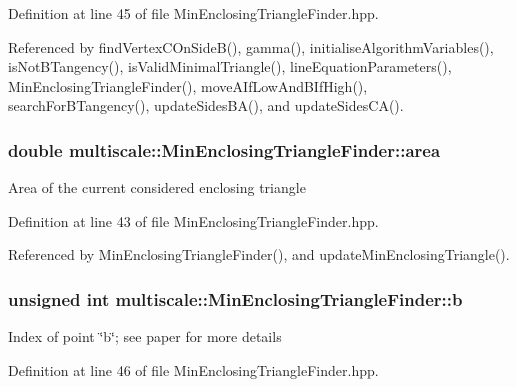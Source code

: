 \-Definition at line 45 of file \-Min\-Enclosing\-Triangle\-Finder.\-hpp.



\-Referenced by find\-Vertex\-C\-On\-Side\-B(), gamma(), initialise\-Algorithm\-Variables(), is\-Not\-B\-Tangency(), is\-Valid\-Minimal\-Triangle(), line\-Equation\-Parameters(), \-Min\-Enclosing\-Triangle\-Finder(), move\-A\-If\-Low\-And\-B\-If\-High(), search\-For\-B\-Tangency(), update\-Sides\-B\-A(), and update\-Sides\-C\-A().

\hypertarget{classmultiscale_1_1MinEnclosingTriangleFinder_a64ea18728dc70fd6235961c12802123a}{
\subsubsection[{area}]{\setlength{\rightskip}{0pt plus 5cm}double {\bf multiscale\-::\-Min\-Enclosing\-Triangle\-Finder\-::area}}}\label{classmultiscale_1_1MinEnclosingTriangleFinder_a64ea18728dc70fd6235961c12802123a}
\-Area of the current considered enclosing triangle 

\-Definition at line 43 of file \-Min\-Enclosing\-Triangle\-Finder.\-hpp.



\-Referenced by \-Min\-Enclosing\-Triangle\-Finder(), and update\-Min\-Enclosing\-Triangle().

\hypertarget{classmultiscale_1_1MinEnclosingTriangleFinder_a71355f44126b38a4fb55c0c92ab64816}{
\subsubsection[{b}]{\setlength{\rightskip}{0pt plus 5cm}unsigned int {\bf multiscale\-::\-Min\-Enclosing\-Triangle\-Finder\-::b}}}\label{classmultiscale_1_1MinEnclosingTriangleFinder_a71355f44126b38a4fb55c0c92ab64816}
\-Index of point \char`\"{}b\char`\"{}; see paper for more details 

\-Definition at line 46 of file \-Min\-Enclosing\-Triangle\-Finder.\-hpp.



